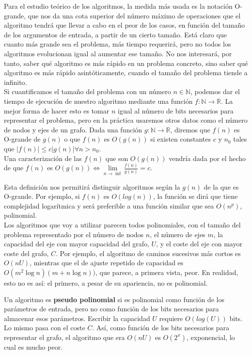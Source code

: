 Para el estudio teórico de los algoritmos, la medida más usada es la notación O-grande, que nos da una cota superior del número máximo de operaciones que el algoritmo tendrá que llevar a cabo en el peor de los casos, en función del tamaño de los argumentos de entrada, a partir de un cierto tamaño.
Está claro que cuanto más grande sea el problema, más tiempo requerirá, pero no todos los algoritmos evolucionan igual al aumentar ese tamaño.
No nos interesará, por tanto, saber qué algoritmo es más rápido en un problema concreto, sino saber qué algoritmo es más rápido asintóticamente, cuando el tamaño del problema tiende a infinito.\\

Si cuantificamos el tamaño del problema con un número $n \in \mathbb{N}$, podemos dar el tiempo de ejecución de nuestro algoritmo mediante una función $f:\mathbb{N}\rightarrow \mathbb{R}$.
La mejor forma de hacer esto es tomar $n$ igual al número de bits necesarios para representar el problema, pero en la práctica usaremos otros datos como el número de nodos y ejes de un grafo.
Dada una función $g:\mathbb{N}\rightarrow \mathbb{R}$, diremos que $f(n)$ es O-grande de $g(n)$ o que $f(n)$ es $O(g(n))$ si existen constantes $c$ y $n_0$ tales que $\left|f(n)\right| \leq c \left|g(n)\right| \forall n > n_0$.\\

Una caracterización de las $f(n)$ que son $O(g(n))$ vendría dada por el hecho de que $f(n)$ es $O(g(n)) \iff \lim\limits_{n\rightarrow \inf} \frac{f(n)}{g(n)} = c$.

Esta definición nos permitirá distinguir algoritmos según la $g(n)$ de la que es O-grande. Por ejemplo, si $f(n)$ es $O(log(n))$, la función se dirá que tiene complejidad logarítmica y será preferible a una función similar que sea $O(n^p)$, polinomial.\\

Los algoritmos que voy a utilizar parecen todos polinomiales, con el tamaño del problema representado por el número de nodos $n$, el número de ejes $m$, la capacidad del eje con mayor capacidad del grafo, $U$, y el coste del eje con mayor coste del grafo, $C$.
Por ejemplo, el algoritmo de caminos sucesivos más cortos es $O(nU)$, mientras que el de ajuste repetido de capacidad es $O(m^2 \log n)(m+n\log n))$, que parece, a primera vista, peor.
En realidad, esto no es así: el primero, a pesar de su apariencia, no es polinomial.

Un algoritmo es \textbf{pseudo polinomial} si es polinomial como función de los parámetros de entrada, pero no como función de los bits necesarios para almacenar esos parámetros.
Escribir la capacidad $U$ requiere $O(log(U))$ bits.
Lo mismo pasa con el coste $C$.
Así, como función de los bits necesarios para representar el grafo, el algoritmo que era $O(nU)$ es $O(2^x)$, exponencial, lo cual es mucho peor.\\

